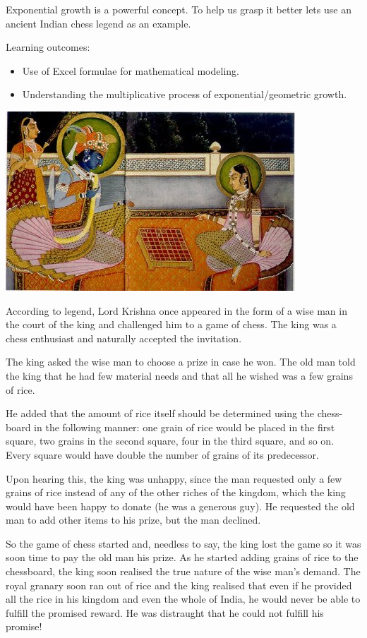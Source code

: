 \documentclass[
  a4paper]{book}
\providecommand{\tightlist}{%
  \setlength{\itemsep}{0pt}\setlength{\parskip}{0pt}}
\begin{document}
Exponential growth is a powerful concept. To help us grasp it better lets use an ancient Indian chess legend as an example.

\begin{do-something}
Learning outcomes:

\begin{itemize}
\tightlist
\item
  Use of Excel formulae for mathematical modeling.
\item
  Understanding the multiplicative process of exponential/geometric
  growth.
\end{itemize}
\end{do-something}

\begin{center}\includegraphics[width=0.5\linewidth]{images/Radha-Krishna_chess} \end{center}

According to legend, Lord Krishna once appeared in the form of a wise man in the court of the king and challenged him to a game of chess. The king was a chess enthusiast and naturally accepted the invitation.

The king asked the wise man to choose a prize in case he won. The old man told the king that he had few material needs and that all he wished was a few grains of rice.

He added that the amount of rice itself should be determined using the chess- board in the following manner: one grain of rice would be placed in the first square, two grains in the second square, four in the third square, and so on. Every square would have double the number of grains of its predecessor.

Upon hearing this, the king was unhappy, since the man requested only a few grains of rice instead of any of the other riches of the kingdom, which the king would have been happy to donate (he was a generous guy). He requested the old man to add other items to his prize, but the man declined.

So the game of chess started and, needless to say, the king lost the game so it was soon time to pay the old man his prize. As he started adding grains of rice to the chessboard, the king soon realised the true nature of the wise man's demand. The royal granary soon ran out of rice and the king realised that even if he provided all the rice in his kingdom and even the whole of India, he would never be able to fulfill the promised reward. He was distraught that he could not fulfill his promise!
\end{document}
